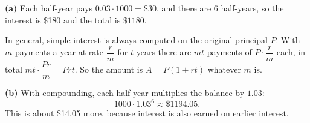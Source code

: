 \textbf{(a)} Each half-year pays $0.03\cdot1000=\$30$, and there are $6$ half-years, so the interest is \$180 and the total is $\boxed{\$1180}$.

In general, simple interest is always computed on the original principal $P$. With $m$ payments a year at rate $\dfrac rm$ for $t$ years there are $mt$ payments of $P\cdot\dfrac rm$ each, in total $mt\cdot\dfrac{Pr}m=Prt$. So the amount is $A=P(1+rt)$ whatever $m$ is.

\textbf{(b)} With compounding, each half-year multiplies the balance by $1.03$:
\[1000\cdot1.03^6\approx\boxed{\$1194.05}.\]
This is about \$14.05 more, because interest is also earned on earlier interest.
